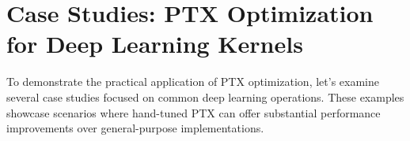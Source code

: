 \section{Case Studies: PTX Optimization for Deep Learning Kernels}

To demonstrate the practical application of PTX optimization, let's examine several case studies focused on common deep learning operations. These examples showcase scenarios where hand-tuned PTX can offer substantial performance improvements over general-purpose implementations.

